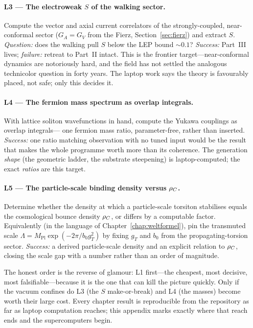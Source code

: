 \paragraph{L3 --- The electroweak $S$ of the walking sector.}
Compute the vector and axial current correlators of the strongly-coupled, near-conformal sector
($G_A=G_V$ from the Fierz, Section~\ref{sec:fierz}) and extract $S$. \emph{Question:} does the
walking pull $S$ below the LEP bound $\sim0.1$? \emph{Success:} Part~III lives; \emph{failure:}
retreat to Part~II intact. This is the frontier target---near-conformal dynamics are notoriously
hard, and the field has not settled the analogous technicolor question in forty years. The
laptop work says the theory is favourably placed, not safe; only this decides it.

\paragraph{L4 --- The fermion mass spectrum as overlap integrals.}
With lattice soliton wavefunctions in hand, compute the Yukawa couplings as overlap integrals---
one fermion mass ratio, parameter-free, rather than inserted. \emph{Success:} one ratio matching
observation with no tuned input would be the result that makes the whole programme worth more
than its coherence. The generation \emph{shape} (the geometric ladder, the substrate steepening)
is laptop-computed; the exact \emph{ratios} are this target.

\paragraph{L5 --- The particle-scale binding density versus $\rho_{C}$.}
Determine whether the density at which a particle-scale torsiton stabilises equals the
cosmological bounce density $\rho_{C}$, or differs by a computable factor. Equivalently (in the
language of Chapter~\ref{chap:weltformel}), pin the transmuted scale $\Lambda = M_{\mathrm{Pl}}
\exp(-2\pi/b_0 g_T^2)$ by fixing $g_T$ and $b_0$ from the propagating-torsion sector.
\emph{Success:} a derived particle-scale density and an explicit relation to $\rho_{C}$, closing
the scale gap with a number rather than an order of magnitude.

\bigskip
\noindent The honest order is the reverse of glamour: L1 first---the cheapest, most decisive,
most falsifiable---because it is the one that can kill the picture quickly. Only if the vacuum
confines do L3 (the $S$ make-or-break) and L4 (the masses) become worth their large cost. Every
chapter result is reproducible from the repository as far as laptop computation reaches; this
appendix marks exactly where that reach ends and the supercomputers begin.
